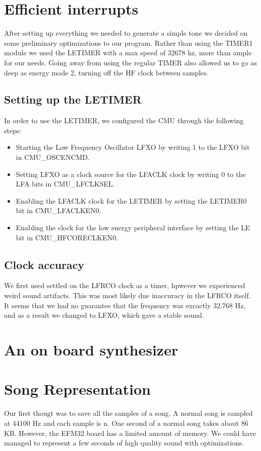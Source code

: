 \section{Efficient interrupts}
After setting up everything we needed to generate a simple tone we decided on some preliminary optimizations to our program. Rather than using the TIMER1 module we used the LETIMER with a max speed of 32678 hz, more than ample for our needs. Going away from using the regular TIMER also allowed us to go as deep as energy mode 2, turning off the HF clock between samples.

\subsection{Setting up the LETIMER}
In order to use the LETIMER, we configured the CMU through the following steps:
\begin{itemize}
  \item Starting the Low Frequency Oscillator LFXO by writing 1 to the LFXO bit in CMU\_OSCENCMD.
  \item Setting LFXO as a clock source for the LFACLK clock by writing 0 to the LFA bits in CMU\_LFCLKSEL.
  \item Enabling the LFACLK clock for the LETIMER by setting the LETIMER0 bit in CMU\_LFACLKEN0.
  \item Enabling the clock for the low energy peripheral interface by setting the LE bit in CMU\_HFCORECLKEN0.
\end{itemize}

\subsection{Clock accuracy}
We first used settled on the LFRCO clock as a timer, hpwever we experienced weird sound artifacts. This was most likely due inaccuracy in the LFRCO itself. It seems that we had no guarantee that the frequency was excactly 32.768 Hz, and as a result we changed to LFXO, which gave a stable sound.


\section{An on board synthesizer}


\section{Song Representation}
Our first thougt was to save all the samples of a song. A normal song is sampled at 44100 Hz and each sample is n. One second of a normal song takes about 86 KB. However, the EFM32 board has a limited amount of memory. We could have managed to represent a few seconds of high quality sound with optimizations. 

